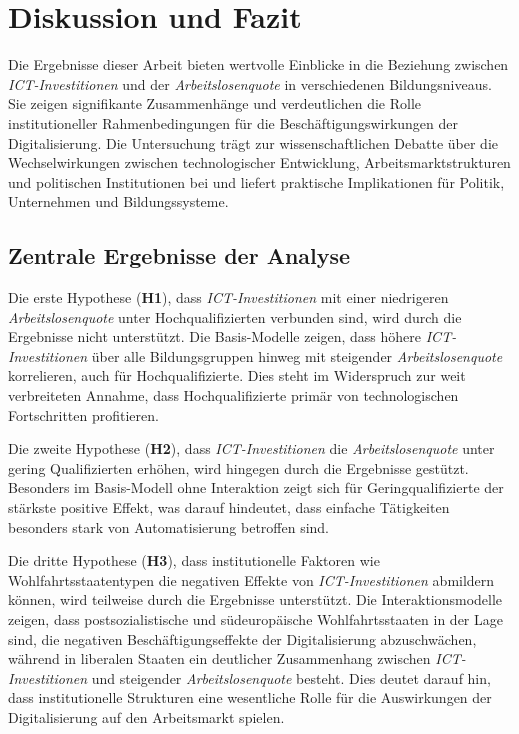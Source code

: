 
\section{Diskussion und Fazit}

Die Ergebnisse dieser Arbeit bieten wertvolle Einblicke in die Beziehung zwischen 
\textit{\ac{ICT}-Investitionen} und der \textit{Arbeitslosenquote} in verschiedenen 
Bildungsniveaus. Sie zeigen signifikante Zusammenhänge und verdeutlichen die Rolle 
institutioneller Rahmenbedingungen für die Beschäftigungswirkungen der Digitalisierung. 
Die Untersuchung trägt zur wissenschaftlichen Debatte über die Wechselwirkungen 
zwischen technologischer Entwicklung, Arbeitsmarktstrukturen und politischen 
Institutionen bei und liefert praktische Implikationen für Politik, Unternehmen 
und Bildungssysteme.

\subsection{Zentrale Ergebnisse der Analyse}

Die erste Hypothese (\textbf{H1}), dass \textit{\ac{ICT}-Investitionen} mit einer 
niedrigeren \textit{Arbeitslosenquote} unter Hochqualifizierten verbunden sind, wird 
durch die Ergebnisse nicht unterstützt. Die Basis-Modelle zeigen, dass höhere 
\textit{\ac{ICT}-Investitionen} über alle Bildungsgruppen hinweg mit steigender 
\textit{Arbeitslosenquote} korrelieren, auch für Hochqualifizierte. Dies steht im 
Widerspruch zur weit verbreiteten Annahme, dass Hochqualifizierte primär von 
technologischen Fortschritten profitieren.

Die zweite Hypothese (\textbf{H2}), dass \textit{\ac{ICT}-Investitionen} die 
\textit{Arbeitslosenquote} unter gering Qualifizierten erhöhen, wird hingegen durch 
die Ergebnisse gestützt. Besonders im Basis-Modell ohne Interaktion zeigt sich für 
Geringqualifizierte der stärkste positive Effekt, was darauf hindeutet, dass einfache 
Tätigkeiten besonders stark von Automatisierung betroffen sind.

Die dritte Hypothese (\textbf{H3}), dass institutionelle Faktoren wie 
Wohlfahrtsstaatentypen die negativen Effekte von \textit{\ac{ICT}-Investitionen} 
abmildern können, wird teilweise durch die Ergebnisse unterstützt. Die Interaktionsmodelle 
zeigen, dass postsozialistische und südeuropäische Wohlfahrtsstaaten in der Lage sind, die 
negativen Beschäftigungseffekte der Digitalisierung abzuschwächen, während in 
liberalen Staaten ein deutlicher Zusammenhang zwischen \textit{\ac{ICT}-Investitionen} 
und steigender \textit{Arbeitslosenquote} besteht. Dies deutet darauf hin, dass 
institutionelle Strukturen eine wesentliche Rolle für die Auswirkungen der 
Digitalisierung auf den Arbeitsmarkt spielen.

